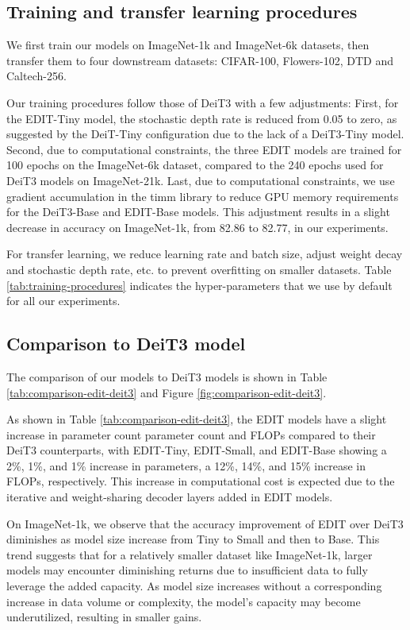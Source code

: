 \documentclass[anon,12pt]{colt2024} %
\begin{document}
\subsection{Training and transfer learning procedures}
We first train our models on ImageNet-1k and ImageNet-6k datasets, then transfer them to four downstream datasets: CIFAR-100, Flowers-102, DTD and Caltech-256.

Our training procedures follow those of DeiT3 with a few adjustments:
First, for the EDIT-Tiny model, the stochastic depth rate is reduced from 0.05 to zero, as suggested by the DeiT-Tiny configuration due to the lack of a DeiT3-Tiny model.
Second, due to computational constraints, the three EDIT models are trained for 100 epochs on the ImageNet-6k dataset, compared to the 240 epochs used for DeiT3 models on ImageNet-21k.
Last, due to computational constraints, we use gradient accumulation in the timm library \cite{rw2019timm} to reduce GPU memory requirements for the DeiT3-Base and EDIT-Base models. This adjustment results in a slight decrease in accuracy on ImageNet-1k, from 82.86 to 82.77, in our experiments.

For transfer learning, we reduce learning rate and batch size, adjust weight decay and stochastic depth rate, etc. to prevent overfitting on smaller datasets.
Table \ref{tab:training-procedures} indicates the hyper-parameters that we use by default for all our experiments.

\subsection{Comparison to DeiT3 model}

The comparison of our models to DeiT3 models is shown in Table \ref{tab:comparison-edit-deit3} and Figure \ref{fig:comparison-edit-deit3}.

As shown in Table \ref{tab:comparison-edit-deit3}, the EDIT models have a slight increase in parameter count parameter count and FLOPs compared to their DeiT3 counterparts, with EDIT-Tiny, EDIT-Small, and EDIT-Base showing a 2\%, 1\%, and 1\% increase in parameters, a 12\%, 14\%, and 15\% increase in FLOPs, respectively. This increase in computational cost is expected due to the iterative and weight-sharing decoder layers added in EDIT models.

On ImageNet-1k, we observe that the accuracy improvement of EDIT over DeiT3 diminishes as model size increase from Tiny to Small and then to Base.
This trend suggests that for a relatively smaller dataset like ImageNet-1k, larger models may encounter diminishing returns due to insufficient data to fully leverage the added capacity.
As model size increases without a corresponding increase in data volume or complexity, the model's capacity may become underutilized, resulting in smaller gains.
\end{document}
